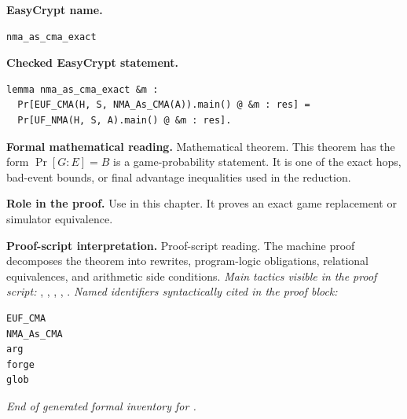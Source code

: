 \begin{formaltheorem}
\noindent\textbf{EasyCrypt name.}
\begin{lstlisting}[language=EasyCrypt,basicstyle=\ttfamily\scriptsize]
nma_as_cma_exact
\end{lstlisting}
\noindent\textbf{Checked EasyCrypt statement.}
\begin{lstlisting}[language=EasyCrypt,basicstyle=\ttfamily\scriptsize]
lemma nma_as_cma_exact &m :
  Pr[EUF_CMA(H, S, NMA_As_CMA(A)).main() @ &m : res] =
  Pr[UF_NMA(H, S, A).main() @ &m : res].
\end{lstlisting}
\noindent\textbf{Formal mathematical reading.}
Mathematical theorem. This theorem has the form \(\Pr[G:E] = B\) is a game-probability statement.  It is one of the exact hops, bad-event bounds, or final advantage inequalities used in the reduction.

\noindent\textbf{Role in the proof.}
Use in this chapter. It proves an exact game replacement or simulator equivalence.

\noindent\textbf{Proof-script interpretation.}
Proof-script reading. The machine proof decomposes the theorem into rewrites, program-logic obligations, relational equivalences, and arithmetic side conditions.
\emph{Main tactics visible in the proof script:} , , , , .
\emph{Named identifiers syntactically cited in the proof block:}
\begin{lstlisting}[language=EasyCrypt,basicstyle=\ttfamily\scriptsize]
EUF_CMA
NMA_As_CMA
arg
forge
glob
\end{lstlisting}

\end{formaltheorem}

\medskip
\noindent\emph{End of generated formal inventory for .}
